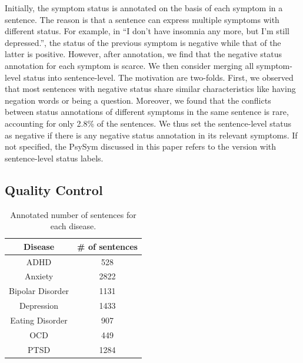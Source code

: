 Initially, the symptom status is annotated on the basis of each symptom in a sentence. The reason is that a sentence can express multiple symptoms with different status. For example, in ``I don't have insomnia any more, but I'm still depressed.'', the status of the previous symptom is negative while that of the latter is positive. However, after annotation, we find that the negative status annotation for each symptom is scarce. We then consider merging all symptom-level status into sentence-level. The motivation are two-folds. First, we observed that most sentences with negative status share similar characteristics like having negation words or being a question. Moreover, we found that the conflicts between status annotations of different symptoms in the same sentence is rare, accounting for only 2.8\% of the sentences. We thus set the sentence-level status as negative if there is any negative status annotation in its relevant symptoms. If not specified, the PsySym discussed in this paper refers to the version with sentence-level status labels.

\subsection{Quality Control}

\begin{table}[ht]
    \small
    \centering
    \begin{tabular}{cc}
    \hline
    Disease & \# of sentences   \\
    \hline
    ADHD & 528\\
    Anxiety & 2822\\
    Bipolar Disorder & 1131 \\
    Depression & 1433\\
    Eating Disorder & 907\\
    OCD & 449\\
    PTSD & 1284\\
    \hline
    \end{tabular}
    \caption{Annotated number of sentences for each disease.}
    \label{tab:disease_count}
\end{table}

